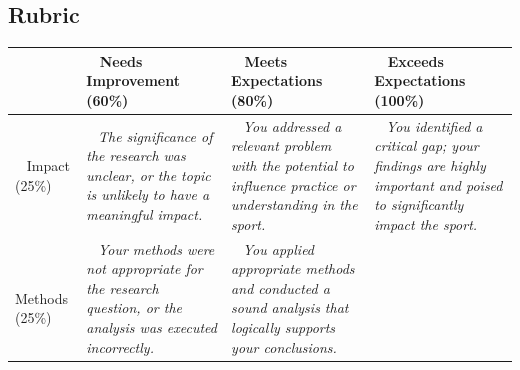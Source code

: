 \documentclass{article}
\begin{document}
    \subsection*{\sc Rubric}

      \vspace{5mm}
      \hspace{-15mm}
      \begin{tabular}{|>{\centering\arraybackslash}p{4cm}|>{\centering\arraybackslash}p{4.5cm}|>{\centering\arraybackslash}p{4.5cm}|>{\centering\arraybackslash}p{4.5cm}|}
        \hline
          ~
          \newline ~ & ~ \newline
          Needs Improvement (60\%)
          \newline ~ & ~ \newline
          Meets Expectations (80\%)
          \newline ~ & ~ \newline
          Exceeds Expectations (100\%)
          \newline ~\\
        \hline
        ~ \newline
        Impact \newline (25\%)
          \newline ~ & ~ \newline
          \it The significance of the research was unclear, or the topic is unlikely to have a meaningful impact.
          \newline ~ & ~ \newline
          \it You addressed a relevant problem with the potential to influence practice or understanding in the sport.
          \newline ~ & ~ \newline
          \it You identified a critical gap; your findings are highly important and poised to significantly impact the sport.
          \newline ~\\
        \hline
        ~ \newline
        Methods \newline (25\%)
          \newline ~ & ~ \newline
          \it Your methods were not appropriate for the research question, or the analysis was executed incorrectly.
          \newline ~ & ~ \newline
          \it You applied appropriate methods and conducted a sound analysis that logically supports your conclusions.

\end{tabular}
\end{document}
